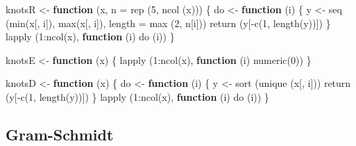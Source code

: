 \documentclass[
  12pt,
]{book}
\newenvironment{Shaded}{\begin{snugshade}}{\end{snugshade}}
\newcommand{\AttributeTok}[1]{\textcolor[rgb]{0.77,0.63,0.00}{#1}}
\newcommand{\ControlFlowTok}[1]{\textcolor[rgb]{0.13,0.29,0.53}{\textbf{#1}}}
\newcommand{\DecValTok}[1]{\textcolor[rgb]{0.00,0.00,0.81}{#1}}
\newcommand{\FunctionTok}[1]{\textcolor[rgb]{0.00,0.00,0.00}{#1}}
\newcommand{\NormalTok}[1]{#1}
\newcommand{\OtherTok}[1]{\textcolor[rgb]{0.56,0.35,0.01}{#1}}
\newcommand{\SpecialCharTok}[1]{\textcolor[rgb]{0.00,0.00,0.00}{#1}}
\begin{document}
\begin{Shaded}
\begin{Highlighting}[]
\NormalTok{knotsR }\OtherTok{\textless{}{-}} \ControlFlowTok{function}\NormalTok{ (x, }\AttributeTok{n =} \FunctionTok{rep}\NormalTok{ (}\DecValTok{5}\NormalTok{, }\FunctionTok{ncol}\NormalTok{ (x))) \{}
\NormalTok{  do }\OtherTok{\textless{}{-}} \ControlFlowTok{function}\NormalTok{ (i) \{}
\NormalTok{    y }\OtherTok{\textless{}{-}} \FunctionTok{seq}\NormalTok{ (}\FunctionTok{min}\NormalTok{(x[, i]), }\FunctionTok{max}\NormalTok{(x[, i]), }\AttributeTok{length =} \FunctionTok{max}\NormalTok{ (}\DecValTok{2}\NormalTok{, n[i]))}
    \FunctionTok{return}\NormalTok{ (y[}\SpecialCharTok{{-}}\FunctionTok{c}\NormalTok{(}\DecValTok{1}\NormalTok{, }\FunctionTok{length}\NormalTok{(y))])}
\NormalTok{  \}}
  \FunctionTok{lapply}\NormalTok{ (}\DecValTok{1}\SpecialCharTok{:}\FunctionTok{ncol}\NormalTok{(x),  }\ControlFlowTok{function}\NormalTok{ (i)}
    \FunctionTok{do}\NormalTok{ (i))}
\NormalTok{\}}

\NormalTok{knotsE }\OtherTok{\textless{}{-}} \ControlFlowTok{function}\NormalTok{ (x) \{}
  \FunctionTok{lapply}\NormalTok{ (}\DecValTok{1}\SpecialCharTok{:}\FunctionTok{ncol}\NormalTok{(x), }\ControlFlowTok{function}\NormalTok{ (i)}
    \FunctionTok{numeric}\NormalTok{(}\DecValTok{0}\NormalTok{))}
\NormalTok{\}}

\NormalTok{knotsD }\OtherTok{\textless{}{-}} \ControlFlowTok{function}\NormalTok{ (x) \{}
\NormalTok{  do }\OtherTok{\textless{}{-}} \ControlFlowTok{function}\NormalTok{ (i) \{}
\NormalTok{    y }\OtherTok{\textless{}{-}} \FunctionTok{sort}\NormalTok{ (}\FunctionTok{unique}\NormalTok{ (x[, i]))}
    \FunctionTok{return}\NormalTok{ (y[}\SpecialCharTok{{-}}\FunctionTok{c}\NormalTok{(}\DecValTok{1}\NormalTok{, }\FunctionTok{length}\NormalTok{(y))])}
\NormalTok{  \}}
  \FunctionTok{lapply}\NormalTok{ (}\DecValTok{1}\SpecialCharTok{:}\FunctionTok{ncol}\NormalTok{(x),  }\ControlFlowTok{function}\NormalTok{ (i)}
    \FunctionTok{do}\NormalTok{ (i))}
\NormalTok{\}}
\end{Highlighting}
\end{Shaded}

\hypertarget{gram-schmidt}{%
\subsection{Gram-Schmidt}\label{gram-schmidt}}
\end{document}
